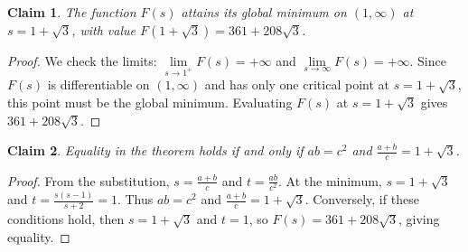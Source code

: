 \documentclass{article}
\newtheorem{claim}{Claim}
\begin{document}
\begin{claim}
The function $F(s)$ attains its global minimum on $(1,\infty)$ at $s=1+\sqrt{3}$, with value $F(1+\sqrt{3})=361+208\sqrt{3}$.
\end{claim}
\begin{proof}
We check the limits: $\lim\limits_{s\to1^{+}}F(s)=+\infty$ and $\lim\limits_{s\to\infty}F(s)=+\infty$. Since $F(s)$ is differentiable on $(1,\infty)$ and has only one critical point at $s=1+\sqrt{3}$, this point must be the global minimum. Evaluating $F(s)$ at $s=1+\sqrt{3}$ gives $361+208\sqrt{3}$.
\end{proof}

\begin{claim}
Equality in the theorem holds if and only if $ab=c^{2}$ and $\frac{a+b}{c}=1+\sqrt{3}$.
\end{claim}
\begin{proof}
From the substitution, $s=\frac{a+b}{c}$ and $t=\frac{ab}{c^{2}}$. At the minimum, $s=1+\sqrt{3}$ and $t=\frac{s(s-1)}{s+2}=1$. Thus $ab=c^{2}$ and $\frac{a+b}{c}=1+\sqrt{3}$. Conversely, if these conditions hold, then $s=1+\sqrt{3}$ and $t=1$, so $F(s)=361+208\sqrt{3}$, giving equality.
\end{proof}
\end{document}
